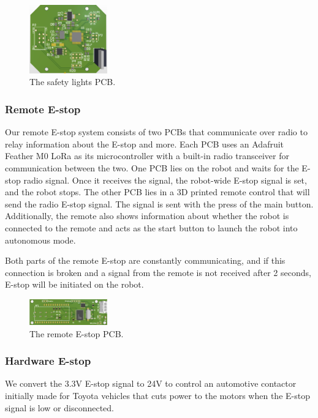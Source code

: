 \begin{figure}[h]
\centering
\includegraphics[width=0.3\textwidth]{images/electrical/SafetyLightsPCB.png}
\caption{The safety lights PCB.}
\end{figure}

\subsubsection{Remote E-stop}

Our remote E-stop system consists of two PCBs that communicate over radio to relay information about the E-stop and more. Each PCB uses an Adafruit Feather M0 LoRa as its microcontroller with a built-in radio transceiver for communication between the two. One PCB lies on the robot and waits for the E-stop radio signal. Once it receives the signal, the robot-wide E-stop signal is set, and the robot stops. The other PCB lies in a 3D printed remote control that will send the radio E-stop signal. The signal is sent with the press of the main button. Additionally, the remote also shows information about whether the robot is connected to the remote and acts as the start button to launch the robot into autonomous mode.

Both parts of the remote E-stop are constantly communicating, and if this connection is broken and a signal from the remote is not received after 2 seconds, E-stop will be initiated on the robot.

\begin{figure}[h]
\centering
\includegraphics[width=0.3\textwidth]{images/electrical/estop.PNG}
\caption{The remote E-stop PCB.}
\end{figure}

\subsubsection{Hardware E-stop}
We convert the 3.3V E-stop signal to 24V to control an automotive contactor initially made for Toyota vehicles that cuts power to the motors when the E-stop signal is low or disconnected.

